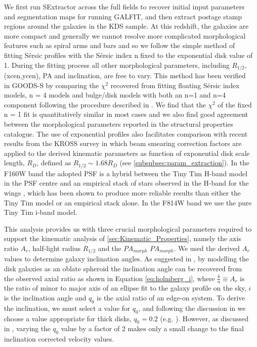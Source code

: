 \documentclass[fleqn,usenatbib]{mn2e}
\newcommand{\Sers}{S\'{e}rsic }
\begin{document}
We first run SExtractor \citep{Bertin1996} across the full fields to recover initial input parameters and segmentation maps for running GALFIT, and then extract postage stamp regions around the galaxies in the KDS sample.
At this redshift, the galaxies are more compact and generally we cannot resolve more complicated morphological features such as spiral arms and bars and so we follow the simple method of fitting \Sers profiles with the \Sers index n fixed to the exponential disk value of 1.
During the fitting process all other morphological parameters, including $R_{1/2}$, (xcen,ycen), PA and inclination, are free to vary.
This method has been verified in GOODS-S by comparing the $\chi ^{2}$ recovered from fitting floating \Sers index models, n = 4 models and bulge/disk models with both an n=1 and n=4 component following the procedure described in \cite{Bruce2012}.
We find that the $\chi^{2}$ of the fixed n = 1 fit is quantitatively similar in most cases and we also find good agreement between the morphological parameters reported in the \cite{VanderWel2012} structural properties catalogue.
The use of exponential profiles also facilitates comparison with recent results from the KROSS survey \citep{Harrison2017} in which beam smearing correction factors are applied to the derived kinematic parameters as function of exponential disk scale length, $R_{D}$, defined as $R_{1/2} \sim 1.68 R_{D}$ (see \cref{subsubsec:param_extraction}).
In the F160W band the adopted PSF is a hybrid between the Tiny Tim H-band model \citep{Krist2011} in the PSF centre and an empirical stack of stars observed in the H-band for the wings \citep{VanderWel2012}, which has been shown to produce more reliable results than either the Tiny Tim model or an empirical stack alone.
In the F814W band we use the pure Tiny Tim i-band model.

This analysis provides us with three crucial morphological parameters required to support the kinematic analysis of \cref{sec:Kinematic_Properties}, namely the axis ratio $A_{r}$, half-light radius $R_{1/2}$ and the $PA_{morph}$ $PA_{morph}$.
We used the derived $A_{r}$ values to determine galaxy inclination angles.
As suggested in \cite{Holmberg1958}, by modelling the disk galaxies as an oblate spheroid the inclination angle can be recovered from the observed axial ratio as shown in Equation \ref{eq:holmberg_i}, where $\frac{b}{a} \equiv A_{r}$ is the ratio of minor to major axis of an ellipse fit to the galaxy profile on the sky, $i$ is the inclination angle and $q_{0}$ is the axial ratio of an edge-on system.
To derive the inclination, we must select a value for $q_{0}$, and following the discussion in \citep{Law2012a} we choose a value appropriate for thick disks, $q_{0} = 0.2$ (e.g. \cite{Epinat2012,Harrison2017}).
However, as discussed in \cite{Harrison2017}, varying the $q_{0}$ value by a factor of 2 makes only a small change to the final inclination corrected velocity values.
\end{document}
